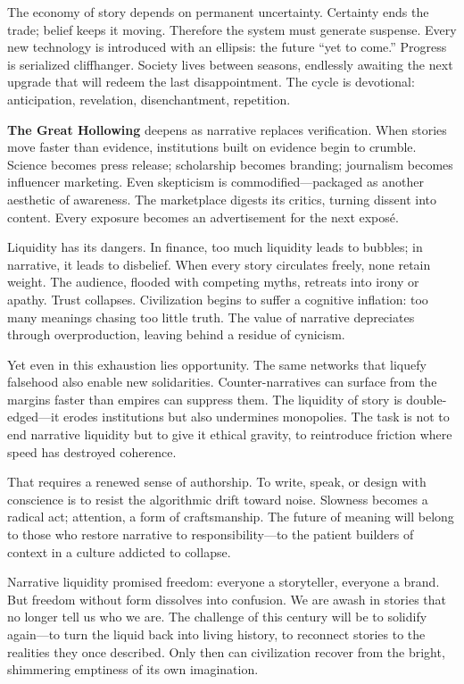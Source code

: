 \documentclass[11pt,twoside]{book}
\begin{document}
The economy of story depends on permanent uncertainty.  Certainty ends the trade; belief keeps it moving.  Therefore the system must generate suspense.  Every new technology is introduced with an ellipsis: the future “yet to come.”  Progress is serialized cliffhanger.  Society lives between seasons, endlessly awaiting the next upgrade that will redeem the last disappointment.  The cycle is devotional: anticipation, revelation, disenchantment, repetition.

\textbf{The Great Hollowing} deepens as narrative replaces verification.  When stories move faster than evidence, institutions built on evidence begin to crumble.  Science becomes press release; scholarship becomes branding; journalism becomes influencer marketing.  Even skepticism is commodified—packaged as another aesthetic of awareness.  The marketplace digests its critics, turning dissent into content.  Every exposure becomes an advertisement for the next exposé.

Liquidity has its dangers.  In finance, too much liquidity leads to bubbles; in narrative, it leads to disbelief.  When every story circulates freely, none retain weight.  The audience, flooded with competing myths, retreats into irony or apathy.  Trust collapses.  Civilization begins to suffer a cognitive inflation: too many meanings chasing too little truth.  The value of narrative depreciates through overproduction, leaving behind a residue of cynicism.

Yet even in this exhaustion lies opportunity.  The same networks that liquefy falsehood also enable new solidarities.  Counter-narratives can surface from the margins faster than empires can suppress them.  The liquidity of story is double-edged—it erodes institutions but also undermines monopolies.  The task is not to end narrative liquidity but to give it ethical gravity, to reintroduce friction where speed has destroyed coherence.

That requires a renewed sense of authorship.  To write, speak, or design with conscience is to resist the algorithmic drift toward noise.  Slowness becomes a radical act; attention, a form of craftsmanship.  The future of meaning will belong to those who restore narrative to responsibility—to the patient builders of context in a culture addicted to collapse.

Narrative liquidity promised freedom: everyone a storyteller, everyone a brand.  But freedom without form dissolves into confusion.  We are awash in stories that no longer tell us who we are.  The challenge of this century will be to solidify again—to turn the liquid back into living history, to reconnect stories to the realities they once described.  Only then can civilization recover from the bright, shimmering emptiness of its own imagination.
\end{document}
